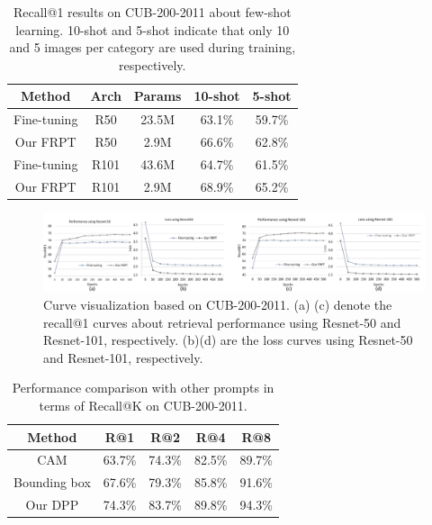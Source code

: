 \documentclass[letterpaper]{article} %
\begin{document}
\begin{table}\centering

	\begin{tabular}{c|c|c||c|c}
		\hline
		\hline
		Method & Arch & Params & 10-shot & 5-shot \\
		\hline
		\hline
		Fine-tuning & R50 &  23.5M  & 63.1\% & 59.7\%  \\ 
		Our FRPT & R50 &  2.9M  & 66.6\% &  62.8\%  \\
		Fine-tuning & R101 & 43.6M  & 64.7\%  & 61.5\% \\ 
		Our FRPT & R101 & 2.9M & 68.9\% & 65.2\% \\
		\hline
		\hline

\end{tabular}
	\caption{  Recall@1 results on CUB-200-2011 about few-shot learning. 10-shot and 5-shot indicate that only 10 and 5 images per category are used during training, respectively.
} 
\end{table}

\begin{figure}[t]
\begin{center}
  \includegraphics[width=0.93\linewidth]{vce}
\end{center}
  \caption{Curve visualization based on CUB-200-2011. (a) (c) denote the recall@1 curves about retrieval performance using Resnet-50 and Resnet-101, respectively. (b)(d) are the loss curves using Resnet-50 and Resnet-101, respectively.
  }

\end{figure}

\begin{table}\centering

\begin{tabular}{c||cccc}
\hline \hline
Method & R@1 & R@2 & R@4 & R@8 \\
\hline 
CAM & 63.7\% & 74.3\% & 82.5\%  &89.7\% \\
Bounding box & 67.6\% & 79.3\%& 85.8\%& 91.6\% \\
\hline
Our DPP &74.3\% & 83.7\% & 89.8\% &94.3\% \\
\hline \hline
\end{tabular}
\caption{Performance comparison with other prompts in terms of Recall@K on CUB-200-2011.}
\end{table}
\end{document}
